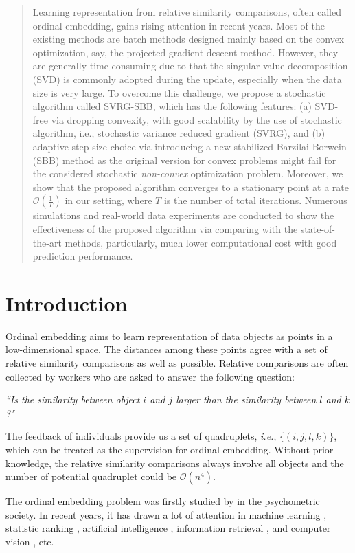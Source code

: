 \documentclass[letterpaper]{article} %
\begin{document}
\begin{abstract}
	Learning representation from relative similarity comparisons, often called ordinal embedding, gains rising attention in recent years. Most of the existing methods are batch methods designed mainly based on the convex optimization, say, the projected gradient descent method. However, they are generally time-consuming due to that the singular value decomposition (SVD) is commonly adopted during the update, especially when the data size is very large. To overcome this challenge, we propose a stochastic algorithm called SVRG-SBB, which has the following features: (a) SVD-free via dropping convexity, with good scalability by the use of stochastic algorithm, i.e., stochastic variance reduced gradient (SVRG), and (b) adaptive step size choice via introducing a new stabilized Barzilai-Borwein (SBB) method as the original version for convex problems might fail for the considered stochastic \textit{non-convex} optimization problem. Moreover, we show that the proposed algorithm converges to a stationary point at a rate $\mathcal{O}(\frac{1}{T})$ in our setting, where $T$ is the number of total iterations. Numerous simulations and real-world data experiments are conducted to show the effectiveness of the proposed algorithm via comparing with the state-of-the-art methods, particularly, much lower computational cost with good prediction performance.
\end{abstract}

\section{Introduction}

 Ordinal embedding aims to learn representation of data objects as points in a low-dimensional space. The distances among these points agree with a set of relative similarity comparisons as well as possible. Relative comparisons are often collected by workers who are asked to answer the following question:
	
\emph{``Is the similarity between object $i$ and $j$ larger than the similarity between $l$ and $k$?"}
	
The feedback of individuals provide us a set of quadruplets, \textit{i.e.}, $\{(i,j,l,k)\}$, which can be treated as the supervision for ordinal embedding. Without prior knowledge, the relative similarity comparisons always involve all objects and the number of potential quadruplet could be $\mathcal{O}(n^4)$.
	
The ordinal embedding problem was firstly studied by \cite{Shepard1962a,Shepard1962b,Kruskal1964a,Kruskal1964b} in the psychometric society. In recent years, it has drawn a lot of attention in machine learning \cite{jamieson2011low,53e99af7b7602d97023851bf,2015arXiv150102861A,NIPS2016_6554}, statistic ranking \cite{McFee:2011:LMS:1953048.1953063,kevin2011active}, artificial intelligence \cite{Heikinheimo2013TheCA,503}, information retrieval \cite{7410580}, and computer vision \cite{wah2014similarity,wilberKKB2015concept}, etc.
\end{document}
